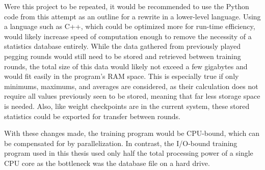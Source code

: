 Were this project to be repeated,
it would be recommended to use the Python code from this attempt as an outline
for a rewrite in a lower-level language.
%
Using a language such as C++,
which could be optimized more for run-time efficiency,
would likely increase speed of computation enough to remove the necessity
of a statistics database entirely.
%
While the data gathered from previously played pegging rounds would still need
to be stored and retrieved between training rounds,
the total size of this data would likely not exceed a few gigabytes and would fit
easily in the program's RAM space.
%
This is especially true if only
minimums, maximums, and averages
are considered,
as their calculation does not require all values previously seen to be stored,
meaning that far less storage space is needed.
%
Also,
like weight checkpoints are in the current system,
these stored statistics could be exported
for transfer between rounds.

With these changes made,
the training program would be CPU-bound,
which can be compensated for by parallelization.
%
In contrast,
the I/O-bound training program used in this thesis used only half the total
processing power of a single CPU core
as the bottleneck was the database file on a hard drive.


